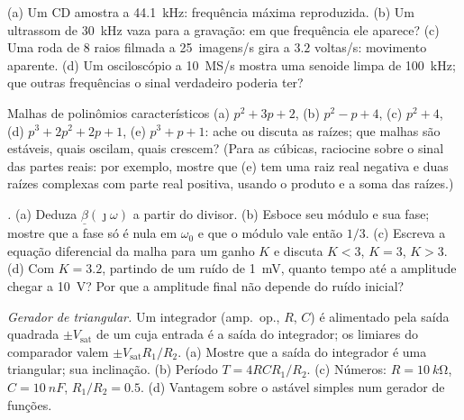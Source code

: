 \begin{exercise}[$\star$]\label{exo:b2:feedback-oscillators:4}
(a) Um CD amostra a \qty{44.1}{kHz}: frequência máxima reproduzida. (b) Um
ultrassom de \qty{30}{kHz} vaza para a gravação: em que frequência
ele aparece? (c) Uma roda de $8$ raios filmada a \qty{25}{imagens/s} gira
a $3.2$ voltas/s: movimento aparente. (d) Um osciloscópio a \qty{10}{MS/s}
mostra uma senoide limpa de \qty{100}{kHz}; que outras frequências o sinal
verdadeiro poderia ter?
\end{exercise}

\begin{exercise}[$\star\star$]\label{exo:b2:feedback-oscillators:5}
Malhas de polinômios característicos (a) $p^2 + 3p + 2$, (b) $p^2 - p +
4$, (c) $p^2 + 4$, (d) $p^3 + 2p^2 + 2p + 1$, (e) $p^3 + p + 1$: ache ou
discuta as raízes; que malhas são estáveis, quais oscilam, quais crescem?
(Para as cúbicas, raciocine sobre o sinal das partes reais: por exemplo, mostre que (e)
tem uma raiz real negativa e duas raízes complexas com parte real
positiva, usando o produto e a soma das raízes.)
\end{exercise}

\begin{exercise}[$\star\star$]\label{exo:b2:feedback-oscillators:6}
\emph{.} (a) Deduza $\underline\beta(\jmath\omega)$ a partir do divisor.
(b) Esboce seu módulo e sua fase; mostre que a fase só é nula em
$\omega_0$ e que o módulo vale então $1/3$. (c) Escreva a equação
diferencial da malha para um ganho $K$ e discuta $K < 3$, $K = 3$, $K > 3$.
(d) Com $K = 3.2$, partindo de um ruído de \qty{1}{mV}, quanto tempo até a
amplitude chegar a \qty{10}{V}? Por que a amplitude final não depende do
ruído inicial?
\end{exercise}

\begin{exercise}[$\star\star$]\label{exo:b2:feedback-oscillators:7}
\emph{Gerador de triangular.} Um integrador (amp.\ op., $R$, $C$) é alimentado pela
saída quadrada $\pm V_{\text{sat}}$ de um  cuja entrada
é a saída do integrador; os limiares do comparador valem
$\pm V_{\text{sat}}R_1/R_2$. (a) Mostre que a saída do integrador é uma triangular;
sua inclinação. (b) Período $T = 4RCR_1/R_2$. (c) Números: $R = \qty{10}{k\ohm}$,
$C = \qty{10}{nF}$, $R_1/R_2 = 0.5$. (d) Vantagem sobre o astável simples
num gerador de funções.
\end{exercise}

